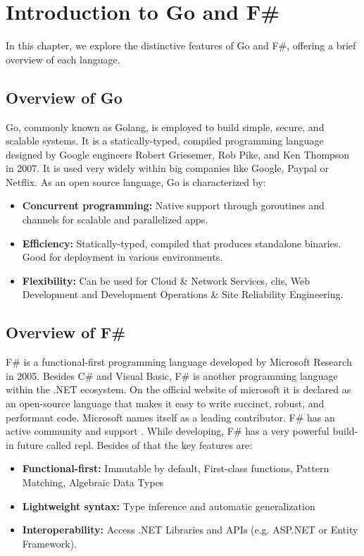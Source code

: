 
\chapter{Introduction to Go and F\#}\label{chap:introgoandfsharp}
In this chapter, we explore the distinctive features of Go and F\#, offering a brief overview of each language.

    \section{Overview of Go}\label{sec:go-overview}
    Go, commonly known as Golang, is employed to build simple, secure, and scalable systems. It is a statically-typed, compiled programming language designed by Google engineers Robert Griesemer, Rob Pike, and Ken Thompson in 2007. It is used very widely within big companies like Google, Paypal or Netflix. As an open source language, Go is characterized by: 
    \begin{itemize}
        \item \textbf{Concurrent programming:}  Native support through goroutines and channels for scalable and parallelized \ac{app}s.
        \item \textbf{Efficiency:} Statically-typed, compiled that produces standalone binaries. Good for deployment in various environments.
        \item \textbf{Flexibility:} Can be used for Cloud \& Network Services, \ac{cli}s, Web Development and Development Operations \& Site Reliability Engineering.
    \end{itemize}
    \cite{Gowebsite}

    \section{Overview of F\#}\label{sec:fsharp-overview}
    F\# is a functional-first programming language developed by Microsoft Research in 2005.
    Besides C\# and Visual Basic, F\# is another programming language within the .NET ecosystem. On the official website of microsoft it is declared as an open-source language that makes it easy to write succinct, robust, and performant code. Microsoft names itself as a leading contributor. F\# has an active community and support \cite{Fsharpfoundation}.
    While developing, F\# has a very powerful build-in future called \ac{repl}. Besides of that the key features are:
    \begin{itemize}
        \item \textbf{Functional-first:} Immutable by default, First-class functions, Pattern Matching, Algebraic Data Types 
        \item \textbf{Lightweight syntax:} Type inference and automatic generalization
        \item \textbf{Interoperability:} Access .NET Libraries and APIs (e.g. ASP.NET or Entity Framework). 
    \end{itemize}
    \cite{Dotnet}
    \cite{Keyfeaturesfsharp}


